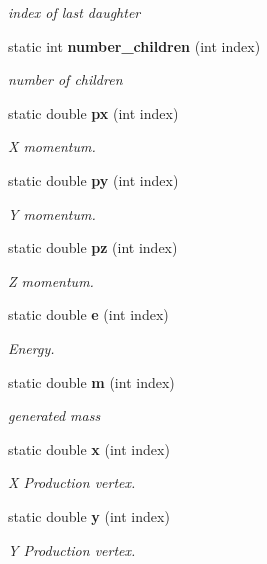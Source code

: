 \begin{CompactItemize}
\begin{CompactList}\small\item\em index of last daughter \item\end{CompactList}\item 
static int {\bf number\_\-children} (int index)
\begin{CompactList}\small\item\em number of children \item\end{CompactList}\item 
static double {\bf px} (int index)
\begin{CompactList}\small\item\em X momentum. \item\end{CompactList}\item 
static double {\bf py} (int index)
\begin{CompactList}\small\item\em Y momentum. \item\end{CompactList}\item 
static double {\bf pz} (int index)
\begin{CompactList}\small\item\em Z momentum. \item\end{CompactList}\item 
static double {\bf e} (int index)
\begin{CompactList}\small\item\em Energy. \item\end{CompactList}\item 
static double {\bf m} (int index)
\begin{CompactList}\small\item\em generated mass \item\end{CompactList}\item 
static double {\bf x} (int index)
\begin{CompactList}\small\item\em X Production vertex. \item\end{CompactList}\item 
static double {\bf y} (int index)
\begin{CompactList}\small\item\em Y Production vertex. \item\end{CompactList}\item 

\end{CompactItemize}
